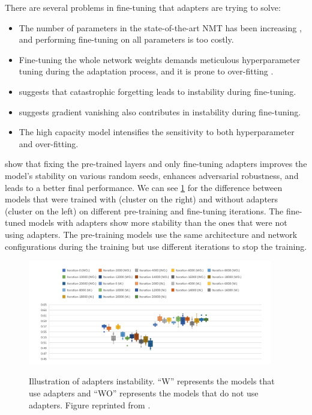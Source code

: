 There are several problems in fine-tuning that adapters are trying to solve:
\begin{itemize}
    \item The number of parameters in the state-of-the-art NMT has been increasing , and performing fine-tuning on all parameters is too costly.
    \item Fine-tuning the whole network weights demands meticulous hyperparameter tuning during the adaptation process, and it is prone to over-fitting .
    \item {} suggests that catastrophic forgetting leads to instability during fine-tuning.
    \item {} suggests gradient vanishing also contributes in instability during fine-tuning.
    \item The high capacity model intensifies the sensitivity to both hyperparameter and over-fitting.
\end{itemize}

 show that fixing the pre-trained layers and only fine-tuning adapters improves the model's stability on various random seeds, enhances adversarial robustness, and leads to a better final performance. We can see \cref{img:adapters_instability} for the difference between models that were trained with (cluster on the right) and without adapters (cluster on the left) on different pre-training and fine-tuning iterations. The fine-tuned models with adapters show more stability than the ones that were not using adapters. The pre-training models use the same architecture and network configurations during the training but use different iterations to stop the training.

\begin{figure}[h]
    {\includegraphics[width=0.95\textwidth]{img/adapters_instability.png}}
    \centering
    \caption{Illustration of adapters instability. ``W'' represents the models that use adapters and ``WO'' represents the models that do not use adapters. Figure reprinted from \cite{han2021robust}.}
    \label{img:adapters_instability}
\end{figure}